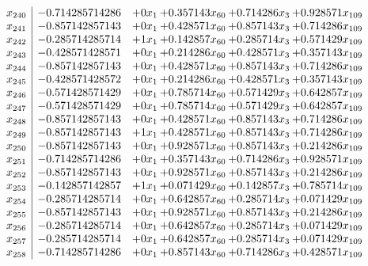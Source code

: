 \documentclass[11pt]{article}
\begin{document}
\[\begin{array}{c| c c@{\hskip 2pt} c@{\hskip 2pt} c@{\hskip 2pt} c@{\hskip 2pt} }
 x_{240}   &  -0.714285714286 & + 0 x_{1} & + 0.357143 x_{60} & + 0.714286 x_{3} & + 0.928571 x_{109}\\
 x_{241}   &  -0.857142857143 & + 0 x_{1} & + 0.428571 x_{60} & + 0.857143 x_{3} & + 0.714286 x_{109}\\
 x_{242}   &  -0.285714285714 & + 1 x_{1} & + 0.142857 x_{60} & + 0.285714 x_{3} & + 0.571429 x_{109}\\
 x_{243}   &  -0.428571428571 & + 0 x_{1} & + 0.214286 x_{60} & + 0.428571 x_{3} & + 0.357143 x_{109}\\
 x_{244}   &  -0.857142857143 & + 0 x_{1} & + 0.428571 x_{60} & + 0.857143 x_{3} & + 0.714286 x_{109}\\
 x_{245}   &  -0.428571428572 & + 0 x_{1} & + 0.214286 x_{60} & + 0.428571 x_{3} & + 0.357143 x_{109}\\
 x_{246}   &  -0.571428571429 & + 0 x_{1} & + 0.785714 x_{60} & + 0.571429 x_{3} & + 0.642857 x_{109}\\
 x_{247}   &  -0.571428571429 & + 0 x_{1} & + 0.785714 x_{60} & + 0.571429 x_{3} & + 0.642857 x_{109}\\
 x_{248}   &  -0.857142857143 & + 0 x_{1} & + 0.428571 x_{60} & + 0.857143 x_{3} & + 0.714286 x_{109}\\
 x_{249}   &  -0.857142857143 & + 1 x_{1} & + 0.428571 x_{60} & + 0.857143 x_{3} & + 0.714286 x_{109}\\
 x_{250}   &  -0.857142857143 & + 0 x_{1} & + 0.928571 x_{60} & + 0.857143 x_{3} & + 0.214286 x_{109}\\
 x_{251}   &  -0.714285714286 & + 0 x_{1} & + 0.357143 x_{60} & + 0.714286 x_{3} & + 0.928571 x_{109}\\
 x_{252}   &  -0.857142857143 & + 0 x_{1} & + 0.928571 x_{60} & + 0.857143 x_{3} & + 0.214286 x_{109}\\
 x_{253}   &  -0.142857142857 & + 1 x_{1} & + 0.071429 x_{60} & + 0.142857 x_{3} & + 0.785714 x_{109}\\
 x_{254}   &  -0.285714285714 & + 0 x_{1} & + 0.642857 x_{60} & + 0.285714 x_{3} & + 0.071429 x_{109}\\
 x_{255}   &  -0.857142857143 & + 0 x_{1} & + 0.928571 x_{60} & + 0.857143 x_{3} & + 0.214286 x_{109}\\
 x_{256}   &  -0.285714285714 & + 0 x_{1} & + 0.642857 x_{60} & + 0.285714 x_{3} & + 0.071429 x_{109}\\
 x_{257}   &  -0.285714285714 & + 0 x_{1} & + 0.642857 x_{60} & + 0.285714 x_{3} & + 0.071429 x_{109}\\
 x_{258}   &  -0.714285714286 & + 0 x_{1} & + 0.857143 x_{60} & + 0.714286 x_{3} & + 0.428571 x_{109}\\

\end{array}\]
\end{document}
